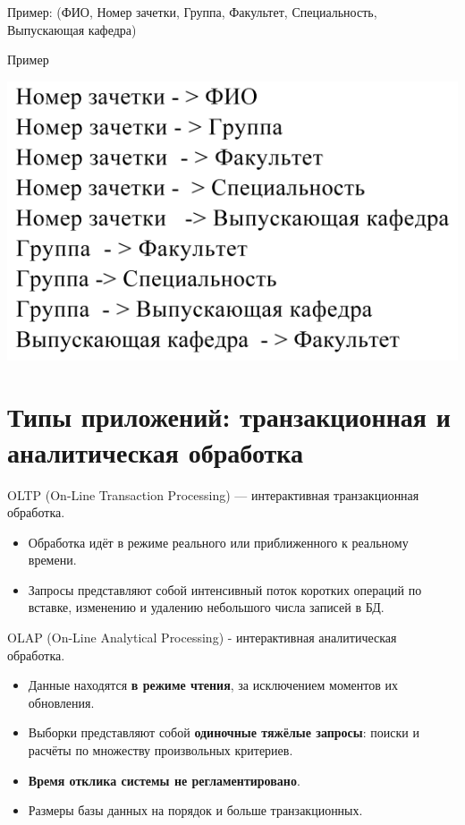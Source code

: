 \documentclass{beamer}
\begin{document}
\begin{frame}
Пример: (ФИО, Номер зачетки, Группа, Факультет, Специальность, Выпускающая кафедра)
\begin{block}{Пример}
\begin{center}
\includegraphics[scale=0.5]{images/nf-3.png}
\end{center}
\end{block}
\end{frame}

\section{Типы приложений: транзакционная и аналитическая обработка}
\begin{frame}
OLTP (On-Line Transaction Processing) — интерактивная транзакционная обработка.
\begin{itemize}
\item Обработка идёт в режиме реального или приближенного к реальному времени.
\item Запросы представляют собой интенсивный поток коротких операций по вставке, изменению и удалению небольшого числа записей в БД.
\end{itemize}
OLAP (On-Line Analytical Processing) - интерактивная аналитическая обработка. 
\begin{itemize}
\item Данные находятся \textbf{в режиме чтения}, за исключением моментов их обновления.
\item Выборки представляют собой \textbf{одиночные тяжёлые запросы}: поиски и расчёты по множеству произвольных критериев.
\item \textbf{Время отклика системы не регламентировано}.
\item Размеры базы данных на порядок и больше транзакционных.
\end{itemize}
\end{frame}
\end{document}
